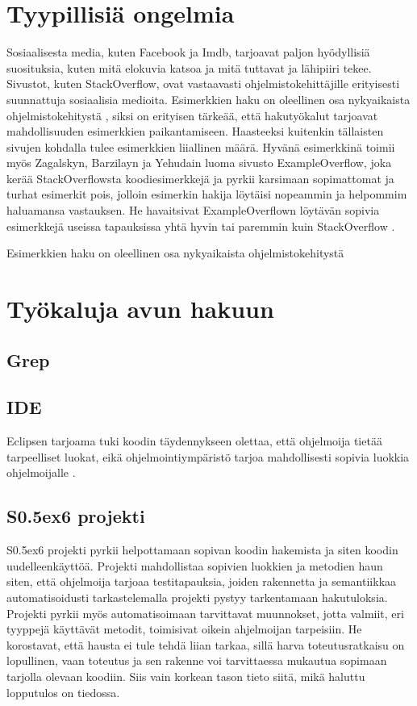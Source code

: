 \documentclass[finnish]{../tktltiki2}
\theoremstyle{definition}
\theoremstyle{remark}
\begin{document}
\section{Tyypillisiä ongelmia}
Sosiaalisesta media, kuten Facebook ja Imdb, tarjoavat paljon hyödyllisiä suosituksia, kuten mitä elokuvia katsoa ja mitä tuttavat ja lähipiiri tekee. Sivustot, kuten StackOverflow, ovat vastaavasti ohjelmistokehittäjille erityisesti suunnattuja sosiaalisia medioita.
Esimerkkien haku on oleellinen osa nykyaikaista ohjelmistokehitystä \cite{example-overflow-social-media-for-code-recommendations}, siksi on erityisen tärkeää, että hakutyökalut tarjoavat mahdollisuuden esimerkkien paikantamiseen.
Haasteeksi kuitenkin tällaisten sivujen kohdalla tulee esimerkkien liiallinen määrä. Hyvänä esimerkkinä toimii myös Zagalskyn, Barzilayn ja Yehudain luoma sivusto ExampleOverflow, joka kerää StackOverflowsta koodiesimerkkejä ja pyrkii karsimaan sopimattomat ja turhat esimerkit pois, jolloin esimerkin hakija löytäisi nopeammin ja helpommim haluamansa vastauksen. He havaitsivat ExampleOverflown löytävän sopivia esimerkkejä useissa tapauksissa yhtä hyvin tai paremmin kuin StackOverflow \cite{example-overflow-social-media-for-code-recommendations}.

\cite{social-networking-meets-se}

Esimerkkien haku on oleellinen osa nykyaikaista ohjelmistokehitystä \cite{example-overflow-social-media-for-code-recommendations}

\section{Työkaluja avun hakuun}
\subsection{Grep}
\subsection{IDE}
Eclipsen tarjoama tuki koodin täydennykseen olettaa, että ohjelmoija tietää tarpeelliset luokat, eikä ohjelmointiympäristö tarjoa mahdollisesti sopivia luokkia ohjelmoijalle \cite{jungloid-mining}.
\subsection{S\raise0.5ex\hbox{6} projekti}
S\raise0.5ex\hbox{6} projekti pyrkii helpottamaan sopivan koodin hakemista ja siten koodin uudelleenkäyttöä. Projekti mahdollistaa sopivien luokkien ja metodien haun siten, että ohjelmoija tarjoaa testitapauksia, joiden rakennetta ja semantiikkaa automatisoidusti tarkastelemalla projekti pystyy tarkentamaan hakutuloksia. Projekti pyrkii myös automatisoimaan tarvittavat muunnokset, jotta valmiit, eri tyyppejä käyttävät metodit, toimisivat oikein ahjelmoijan tarpeisiin. He korostavat, että hausta ei tule tehdä liian tarkaa, sillä harva toteutusratkaisu on lopullinen, vaan toteutus ja sen rakenne voi tarvittaessa mukautua sopimaan tarjolla olevaan koodiin. Siis vain korkean tason tieto siitä, mikä haluttu lopputulos on tiedossa. \cite{what-to-search-for}
\end{document}

